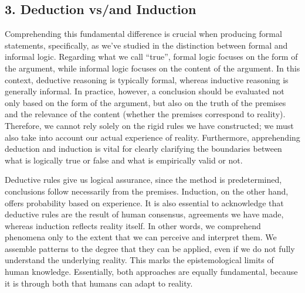 \subsection{3. Deduction vs/and
Induction}\label{deduction-vsand-induction}

Comprehending this fundamental difference is crucial when producing
formal statements, specifically, as we've studied in the distinction
between formal and informal logic. Regarding what we call ``true'',
formal logic focuses on the form of the argument, while informal logic
focuses on the content of the argument. In this context, deductive
reasoning is typically formal, whereas inductive reasoning is generally
informal. In practice, however, a conclusion should be evaluated not
only based on the form of the argument, but also on the truth of the
premises and the relevance of the content (whether the premises
correspond to reality). Therefore, we cannot rely solely on the rigid
rules we have constructed; we must also take into account our actual
experience of reality. Furthermore, apprehending deduction and induction
is vital for clearly clarifying the boundaries between what is logically
true or false and what is empirically valid or not.

Deductive rules give us logical assurance, since the method is
predetermined, conclusions follow necessarily from the premises.
Induction, on the other hand, offers probability based on experience. It
is also essential to acknowledge that deductive rules are the result of
human consensus, agreements we have made, whereas induction reflects
reality itself. In other words, we comprehend phenomena only to the
extent that we can perceive and interpret them. We assemble patterns to
the degree that they can be applied, even if we do not fully understand
the underlying reality. This marks the epistemological limits of human
knowledge. Essentially, both approaches are equally fundamental, because
it is through both that humans can adapt to reality.
